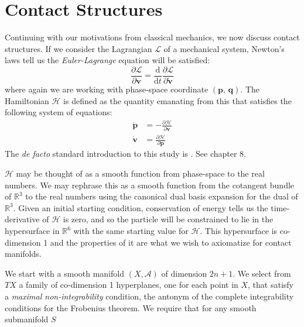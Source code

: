 \section{Contact Structures}
    Continuing with our motivations from classical mechanics, we now discuss
    contact structures. If we consider the Lagrangian $\mathcal{L}$ of a
    mechanical system, Newton's laws tell us the \textit{Euler-Lagrange}
    equation will be satisfied:
    \begin{equation}
        \frac{\partial\mathcal{L}}{\partial\mathbf{v}}
        =\frac{\textrm{d}}{\textrm{d}t}
        \frac{\partial\mathcal{L}}{\partial\dot{\mathbf{v}}}
    \end{equation}
    where again we are working with phase-space coordinate
    $(\mathbf{p},\,\mathbf{q})$. The Hamiltonian $\mathcal{H}$ is defined as
    the quantity emanating from this that satisfies the following system of
    equations:
    \begin{align}
        \dot{\mathbf{p}}&=-\frac{\partial\mathcal{H}}{\partial\mathbf{v}}\\
        \dot{\mathbf{v}}&=\frac{\partial\mathcal{H}}{\partial\mathbf{p}}
    \end{align}
    The \textit{de facto} standard introduction to this study is
    \cite{GoldsteinClassicalMechanics}. See chapter 8.
    \par\hfill\par
    $\mathcal{H}$ may be thought of as a smooth function from phase-space to
    the real numbers. We may rephrase this as a smooth function from the
    cotangent bundle of $\mathbb{R}^{3}$ to the real numbers using the
    canonical dual basis expansion for the dual of $\mathbb{R}^{3}$. Given an
    initial starting condition, conservation of energy tells us the
    time-derivative of $\mathcal{H}$ is zero, and so the particle will be
    constrained to lie in the hypersurface in $\mathbb{R}^{6}$ with the same
    starting value for $\mathcal{H}$. This hypersurface is co-dimension 1 and
    the properties of it are what we wish to axiomatize for contact manifolds.
    \par\hfill\par
    We start with a smooth manifold $(X,\mathcal{A})$ of dimension $2n+1$.
    We select from $TX$ a family of co-dimension 1 hyperplanes,
    one for each point in $X$,
    that satisfy a \textit{maximal non-integrability} condition,
    the antonym of the complete integrability conditions for the Frobenius
    theorem. We require that for any smooth submanifold $S$
